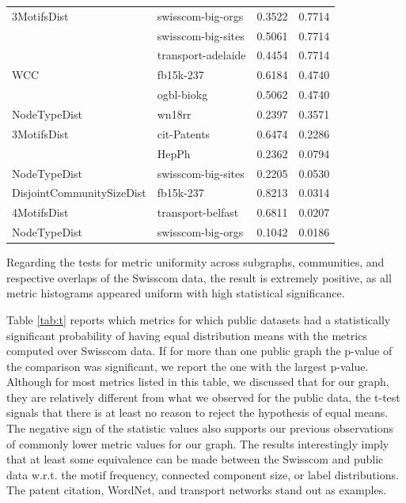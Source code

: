 \begin{table}[H]
\begin{adjustbox}{width=0.5\columnwidth}
\begin{tabular}{llrr}
3MotifsDist & swisscom-big-orgs &       0.3522 &        0.7714 \\
             & swisscom-big-sites &       0.5061 &        0.7714 \\
             & transport-adelaide &       0.4454 &        0.7714 \\
WCC & fb15k-237 &       0.6184 &        0.4740 \\
             & ogbl-biokg &       0.5062 &        0.4740 \\
NodeTypeDist & wn18rr &       0.2397 &        0.3571 \\
3MotifsDist & cit-Patents &       0.6474 &        0.2286 \\
             & HepPh &       0.2362 &        0.0794 \\
NodeTypeDist & swisscom-big-sites &       0.2205 &        0.0530 \\
DisjointCommunitySizeDist & fb15k-237 &       0.8213 &        0.0314 \\
4MotifsDist & transport-belfast &       0.6811 &        0.0207 \\
NodeTypeDist & swisscom-big-orgs &       0.1042 &        0.0186 \\
\bottomrule
\end{tabular}
\end{adjustbox}
\end{table}

Regarding the tests for metric uniformity across subgraphs, communities, and respective overlaps of the Swisscom data, the result is extremely positive, as all metric histograms appeared uniform with high statistical significance. 

Table \ref{tab:t} reports which metrics for which public datasets had a statistically significant probability of having equal distribution means with the metrics computed over Swisscom data. If for more than one public graph the p-value of the comparison was significant, we report the one with the largest p-value. Although for most metrics listed in this table, we discussed that for our graph, they are relatively different from what we observed for the public data, the t-test signals that there is at least no reason to reject the hypothesis of equal means. The negative sign of the statistic values also supports our previous observations of commonly lower metric values for our graph. The results interestingly imply that at least some equivalence can be made between the Swisscom and public data w.r.t. the motif frequency, connected component size, or label distributions. The patent citation, WordNet, and transport networks stand out as examples.

